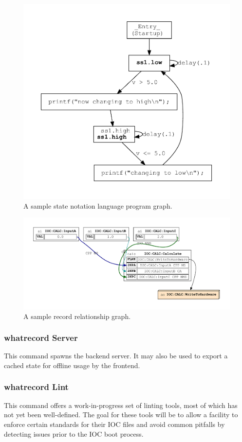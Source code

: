 \documentclass[letter,
               keeplastbox,   %
               ]{jacow}
\begin{document}
\begin{figure}
   \centering
   \includegraphics*[width=.7\columnwidth]{st-simple}
   \caption{A sample state notation language program graph.}
   \label{fig:simple.st}
\end{figure}

\begin{figure}
   \centering
   \includegraphics*[width=.9\columnwidth]{calc-records}
   \caption{A sample record relationship graph.}
   \label{fig:records}
\end{figure}

\subsubsection{whatrecord Server} This command spawns the backend server.  It
may also be used to export a cached state for offline usage by the frontend.

\subsubsection{whatrecord Lint} This command offers a work-in-progress set of
linting tools, most of which has not yet been well-defined.  The goal for these
tools will be to allow a facility to enforce certain standards for their IOC
files and avoid common pitfalls by detecting issues prior to the IOC boot
process.
\end{document}
